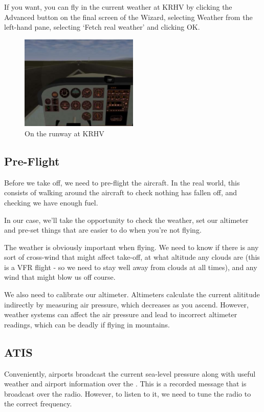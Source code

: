 If you want, you can fly in the current weather at KRHV by clicking the
Advanced button on the final screen of the Wizard, selecting Weather
from the left-hand pane, selecting `Fetch real weather' and clicking OK.

\begin{figure}[!htp]
\centering
\includegraphics[width=0.5\textwidth]{krhvrunway}
\caption{On the runway at KRHV}
\end{figure}

\subsection{Pre-Flight}

Before we take off, we need to pre-flight the aircraft. In the real world,
this consists of walking around the aircraft to check nothing has fallen
off, and checking we have enough fuel.

In our case, we'll take the opportunity to check the weather, set our
altimeter and pre-set things that are easier to do when you're not flying.

The weather is obviously important when flying. We need to know if
there is any sort of cross-wind that might affect take-off, at what
altitude any clouds are (this is a VFR flight - so we need to stay
well away from clouds at all times), and any wind that might blow us off course.

We also need to calibrate our altimeter. Altimeters calculate the
current alititude indirectly by measuring air pressure, which decreases
as you ascend. However, weather systems can affect the air pressure and
lead to incorrect altimeter readings, which can be deadly if flying in mountains.

\subsection{ATIS}

Conveniently, airports broadcast the current sea-level pressure along
with useful weather and airport information over the .
This is a recorded message that is broadcast over the radio.
However, to listen to it, we need to tune the radio to the correct frequency.

